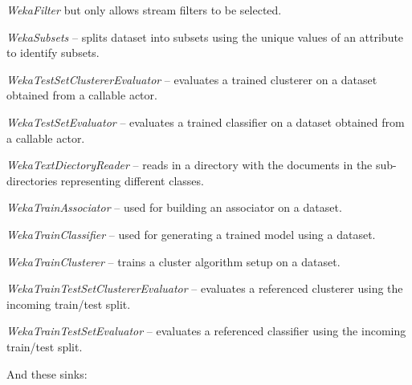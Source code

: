 \begin{tight_itemize}
	\textit{WekaFilter} but only allows stream filters to be selected.
	\item \textit{WekaSubsets} -- splits dataset into subsets using the unique
	values of an attribute to identify subsets.
	\item \textit{WekaTestSetClustererEvaluator} -- evaluates a trained
	clusterer on a dataset obtained from a callable actor.
	\item \textit{WekaTestSetEvaluator} -- evaluates a trained classifier on
	a dataset obtained from a callable actor.
	\item \textit{WekaTextDiectoryReader} -- reads in a directory with the 
	documents in the sub-directories representing different classes.
	\item \textit{WekaTrainAssociator} -- used for building an associator
	on a dataset.
	\item \textit{WekaTrainClassifier} -- used for generating a trained
	model using a dataset.
	\item \textit{WekaTrainClusterer} -- trains a cluster algorithm setup
	on a dataset.
	\item \textit{WekaTrainTestSetClustererEvaluator} -- evaluates a referenced
	clusterer using the incoming train/test split.
	\item \textit{WekaTrainTestSetEvaluator} -- evaluates a referenced classifier
	using the incoming train/test split.
\end{tight_itemize}
And these sinks:
